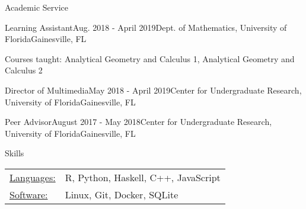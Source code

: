 \documentclass{resume}
\begin{document}
 
\begin{rSection}{Academic Service}
  
\begin{rSubsection}{Learning Assistant}{Aug. 2018 - April
    2019}{Dept. of Mathematics, University of Florida}{Gainesville,
    FL}
   \item Courses taught: Analytical Geometry and Calculus 1, Analytical
    Geometry and Calculus 2
  \end{rSubsection}

 \begin{rSubsection}{Director of Multimedia}{May 2018 - April 2019}{Center for Undergraduate Research, University of Florida}{Gainesville, FL}
\end{rSubsection}


\begin{rSubsection}{Peer Advisor}{August 2017 - May 2018}{Center for Undergraduate Research, University of Florida}{Gainesville, FL}
  \end{rSubsection}

\end{rSection}
  

\begin{rSection}{Skills}
   \begin{tabular}{l p{3in}}
    \underline{Languages:} & R, Python, Haskell, C++, JavaScript \\
     \underline{Software:} & Linux, Git, Docker, SQLite
 \end{tabular}
\end{rSection}
\end{document}
